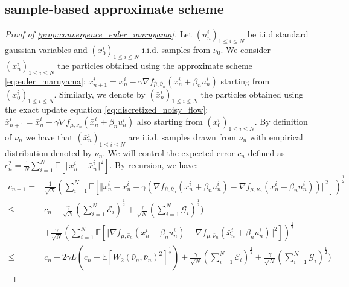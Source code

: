 \subsection{sample-based approximate scheme}
\begin{proof}[Proof of \cref{prop:convergence_euler_maruyama}]\label{proof:propagation_chaos}
Let $(u_{n}^{i})_{1\leq i\leq N}$ be i.i.d standard gaussian variables and $(x_{0}^{i})_{1\leq i\leq N}$ i.i.d. samples from $\nu_0$. We consider $(x_n^i)_{1\leq i\leq N}$ the particles obtained using the approximate scheme \cref{eq:euler_maruyama}: $x_{n+1}^{i}=x_{n}^{i}-\gamma\nabla f_{\hat{\mu},\hat{\nu}_{n}}(x_{n}^{i}+\beta_{n}u_{n}^{i})$ starting from $(x_{0}^{i})_{1\leq i\leq N}$. Similarly, we denote by $(\bar{x}_{n}^{i})_{1\leq i\leq N}$ the particles obtained using the exact update equation \cref{eq:discretized_noisy_flow}: $\bar{x}_{n+1}^{i}=\bar{x}_{n}^{i}-\gamma\nabla f_{\mu,\nu_{n}}(\bar{x}_{n}^{i}+\beta_{n}u_{n}^{i})$ also starting from $(x_{0}^{i})_{1\leq i\leq N}$.
By definition of $\nu_n$ we have that  $(\bar{x}_{n}^{i})_{1\leq i\leq N}$ are i.i.d. samples drawn from $\nu_n$ with empirical distribution denoted by $\bar{\nu}_{n}$.
We will control the expected error $c_{n}$ defined as  $c^2_{n}= \frac{1}{N}\sum_{i=1}^N \mathbb{E}\left[\Vert x_{n}^{i}-\bar{x}_{n}^{i}\Vert^{2}\right]$. By recursion, we have:
\begin{align*}
c_{n+1} = & \frac{1}{\sqrt{N}}\left(\sum_{i=1}^{N}\mathbb{E}\left[\Vert x_{n}^{i}-\bar{x}_{n}^{i}-\gamma(\nabla f_{\hat{\mu},\hat{\nu}_{n}}(x_{n}^{i}+\beta_{n}u_{n}^{i})-\nabla f_{\mu,\nu_{n}}(\bar{x}_{n}^{i}+\beta_{n}u_{n}^{i}))\Vert^{2}\right]\right)^{\frac{1}{2}}\label{eq:main_inequality_c_n_1}\\
\leq &  c_{n} +\frac{\gamma}{\sqrt{N}}(\sum_{i=1}^{N}\mathcal{E}_{i})^{\frac{1}{2}}+\frac{\gamma}{\sqrt{N}}(\sum_{i=1}^{N}\mathcal{G}_{i})^{\frac{1}{2}})  \\
& +\frac{\gamma}{\sqrt{N}}(\sum_{i=1}^{N}\mathbb{E}[\Vert\nabla f_{\mu,\hat{\nu}_{n}}(x_{n}^{i}+\beta_{n}u_{n}^{i})-\nabla f_{\mu,\bar{\nu}_{n}}(\bar{x}_{n}^{i}+\beta_{n}u_{n}^{i})\Vert^{2}])^{\frac{1}{2}}\\
  \leq & c_{n}+2\gamma L(c_{n}+\mathbb{E}[W_{2}(\hat{\nu}_{n},\bar{\nu}_{n})^{2}]^{\frac{1}{2}})+\frac{\gamma}{\sqrt{N}}(\sum_{i=1}^{N}\mathcal{E}_{i})^{\frac{1}{2}}+\frac{\gamma}{\sqrt{N}}(\sum_{i=1}^{N}\mathcal{G}_{i})^{\frac{1}{2}})

\end{align*}
\end{proof}
